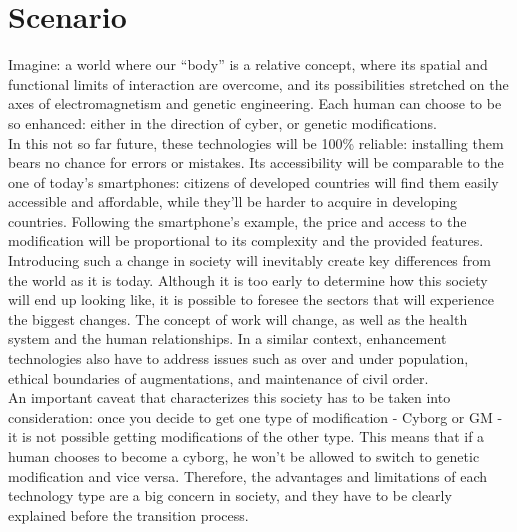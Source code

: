 
\chapter*{Scenario} %
\label{cha:scenario}

Imagine: a world where our “body” is a relative concept, where its spatial and functional limits of interaction are overcome, and its possibilities stretched on the axes of electromagnetism and genetic engineering. Each human can choose to be so enhanced: either in the direction of cyber, or genetic modifications.\\ 

In this not so far future, these technologies will be 100\% reliable: installing them bears no chance for errors or mistakes. Its accessibility will be comparable to the one of today’s smartphones: citizens of developed countries will find them easily accessible and affordable, while they’ll be harder to acquire in developing countries. Following the smartphone’s example, the price and access to the modification will be proportional to its complexity and the provided features.\\

Introducing such a change in society will inevitably create key differences from the world as it is today. Although it is too early to determine how this society will end up looking like, it is possible to foresee the sectors that will experience the biggest changes. The concept of work will change, as well as the health system and the human relationships. In a similar context, enhancement technologies also have to address issues such as over and under population, ethical boundaries of augmentations, and maintenance of civil order.\\

An important caveat that characterizes this society has to be taken into consideration: once you decide to get one type of modification - Cyborg or GM - it is not possible getting modifications of the other type. This means that if a human chooses to become a cyborg, he won’t be allowed to switch to genetic modification and vice versa. Therefore, the advantages and limitations of each technology type are a big concern in society, and they have to be clearly explained before the transition process.

